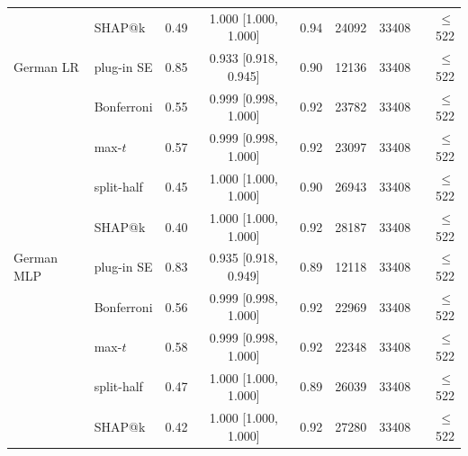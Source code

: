 \begin{tabular}{@{}llccccrr@{}}
 & SHAP@k & 0.49 & 1.000 [1.000, 1.000] & 0.94 & 24092 & 33408 & $\leq$522 \\
\addlinespace[2pt]
German LR & plug-in SE & 0.85 & 0.933 [0.918, 0.945] & 0.90 & 12136 & 33408 & $\leq$522 \\
 & Bonferroni & 0.55 & 0.999 [0.998, 1.000] & 0.92 & 23782 & 33408 & $\leq$522 \\
 & max-$t$ & 0.57 & 0.999 [0.998, 1.000] & 0.92 & 23097 & 33408 & $\leq$522 \\
 & split-half & 0.45 & 1.000 [1.000, 1.000] & 0.90 & 26943 & 33408 & $\leq$522 \\
 & SHAP@k & 0.40 & 1.000 [1.000, 1.000] & 0.92 & 28187 & 33408 & $\leq$522 \\
\addlinespace[2pt]
German MLP & plug-in SE & 0.83 & 0.935 [0.918, 0.949] & 0.89 & 12118 & 33408 & $\leq$522 \\
 & Bonferroni & 0.56 & 0.999 [0.998, 1.000] & 0.92 & 22969 & 33408 & $\leq$522 \\
 & max-$t$ & 0.58 & 0.999 [0.998, 1.000] & 0.92 & 22348 & 33408 & $\leq$522 \\
 & split-half & 0.47 & 1.000 [1.000, 1.000] & 0.89 & 26039 & 33408 & $\leq$522 \\
 & SHAP@k & 0.42 & 1.000 [1.000, 1.000] & 0.92 & 27280 & 33408 & $\leq$522 \\
\bottomrule
\end{tabular}
